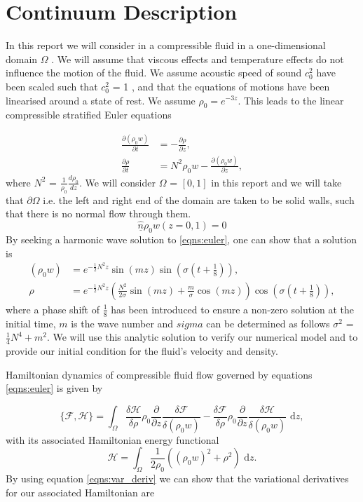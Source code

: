 \documentclass[a4paper,11pt]{article}
\begin{document}
\section{Continuum Description}

In this report we will consider in a compressible fluid in a one-dimensional domain $\Omega$ . We will assume that viscous effects and temperature effects do not influence the motion of the fluid. We assume  acoustic speed of sound $c^2_0$ have been scaled such that  $c^2_0$ = 1  , and that the  equations of motions  have been linearised around a state of rest. We assume $\rho_0 = e^{-3z}$. This leads to the linear compressible stratified Euler equations

\begin{equation}\label{eqns:euler}
\begin{aligned}
\frac{\partial (\rho_0 w) }{\partial t} &= - \frac{\partial \rho }{\partial z},\\
\frac{\partial \rho }{\partial t} &= N^2 \rho_0 w -\frac{\partial  (\rho_0 w) }{\partial z},
\end{aligned}
\end{equation}
where $N^2$ = $\frac{1}{\rho_0}\frac{d\rho_0}{dz}$.
We will consider $\Omega$ = $[0,1]$ in this report and we will take that $\partial \Omega$ i.e. the left and right end of the domain are taken to be solid walls, such that there is no normal flow through them. 
\[ \hat{\underline{n}}\rho_0 w (z=0,1) = 0\]
By seeking a harmonic wave solution to \eqref{eqns:euler}, one can show that a solution is 
\begin{equation*}
\begin{aligned}
(\rho_0 w) &= e^{ -\frac{1}{2} N^2 z} \sin(m z )\sin(\sigma(t+\frac{1}{8})),\\
\rho &= e^{ -\frac{1}{2} N^2 z} (\frac{N^2}{2\sigma}\sin (m z) + \frac{m}{\sigma}  \cos(m z)) \cos(\sigma (t + \frac{1}{8})),
\end{aligned}
\end{equation*}
where a phase shift of $\frac{1}{8}$ has been introduced to ensure a non-zero solution at the initial time, $m$ is the wave number and $sigma$ can be determined as follows $\sigma^2$ = $\frac{1}{4}N^4 + m^2$. We will use this analytic solution to verify our numerical model and to provide our initial condition for the fluid's velocity and density.


Hamiltonian dynamics of compressible fluid flow governed by equations \eqref{eqns:euler} is given by

\begin{equation}\label{eqns:pb} \{ \mathcal{F},  \mathcal{H}\} = \int_\Omega \frac{\delta  \mathcal{H}}{\delta \rho}\rho_0 \frac{\partial}{\partial z}\frac{\delta  \mathcal{F}}{\delta (\rho_0 w)} - \frac{\delta  \mathcal{F}}{\delta \rho}\rho_0 \frac{\partial}{\partial z}\frac{\delta  \mathcal{H}}{\delta(\rho_0 w)} \text{ d}z,\end{equation}
with its associated Hamiltonian energy functional
\[  \mathcal{H} = \int_\Omega \frac{1}{2 \rho_0} ( (\rho_0 w)^2 + \rho^2) \text{ d}z.\]
By using equation \eqref{eqns:var_deriv} we can show  that the variational derivatives for our associated Hamiltonian are
\end{document}
